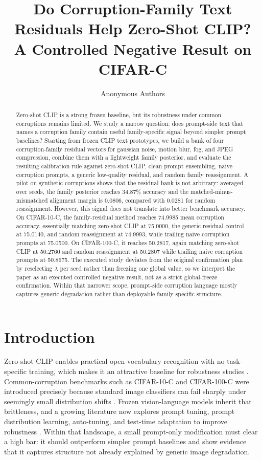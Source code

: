 \documentclass{article}
\title{Do Corruption-Family Text Residuals Help Zero-Shot CLIP?\\A Controlled Negative Result on CIFAR-C}
\author{Anonymous Authors}
\begin{document}
\maketitle

\begin{abstract}
Zero-shot CLIP is a strong frozen baseline, but its robustness under common corruptions remains limited. We study a narrow question: does prompt-side text that names a corruption family contain useful family-specific signal beyond simpler prompt baselines? Starting from frozen CLIP text prototypes, we build a bank of four corruption-family residual vectors for gaussian noise, motion blur, fog, and JPEG compression, combine them with a lightweight family posterior, and evaluate the resulting calibration rule against zero-shot CLIP, clean prompt ensembling, naive corruption prompts, a generic low-quality residual, and random family reassignment. A pilot on synthetic corruptions shows that the residual bank is not arbitrary: averaged over seeds, the family posterior reaches 34.87\% accuracy and the matched-minus-mismatched alignment margin is 0.0806, compared with 0.0281 for random reassignment. However, this signal does not translate into better benchmark accuracy. On CIFAR-10-C, the family-residual method reaches 74.9985 mean corruption accuracy, essentially matching zero-shot CLIP at 75.0000, the generic residual control at 75.0140, and random reassignment at 74.9993, while trailing naive corruption prompts at 75.0500. On CIFAR-100-C, it reaches 50.2817, again matching zero-shot CLIP at 50.2760 and random reassignment at 50.2807 while trailing naive corruption prompts at 50.8675. The executed study deviates from the original confirmation plan by reselecting $\lambda$ per seed rather than freezing one global value, so we interpret the paper as an executed controlled negative result, not as a strict global-freeze confirmation. Within that narrower scope, prompt-side corruption language mostly captures generic degradation rather than deployable family-specific structure.
\end{abstract}

\section{Introduction}

Zero-shot CLIP enables practical open-vocabulary recognition with no task-specific training, which makes it an attractive baseline for robustness studies \citep{radford2021learning}. Common-corruption benchmarks such as CIFAR-10-C and CIFAR-100-C were introduced precisely because standard image classifiers can fail sharply under seemingly small distribution shifts \citep{hendrycks2019benchmarking}. Frozen vision-language models inherit that brittleness, and a growing literature now explores prompt tuning, prompt distribution learning, auto-tuning, and test-time adaptation to improve robustness \citep{shu2022test,metzen2023autoclip,zhu2024frolic,maharana2024enhancing}. Within that landscape, a small prompt-only modification must clear a high bar: it should outperform simpler prompt baselines and show evidence that it captures structure not already explained by generic image degradation.
\end{document}
